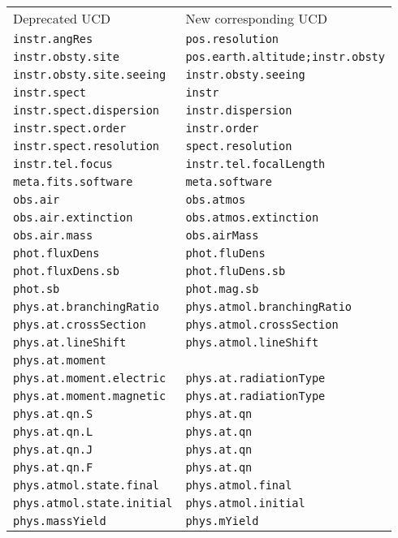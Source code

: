\documentclass[11pt,a4paper]{ivoa}
\begin{document}
\begin{enumerate}
\begin{tabular}{|l|l|}
\sptablerule
Deprecated UCD & New corresponding UCD\\
\sptablerule
{\tt instr.angRes} & {\tt pos.resolution}\\
{\tt instr.obsty.site} & {\tt pos.earth.altitude;instr.obsty}\\ 
{\tt instr.obsty.site.seeing} & {\tt instr.obsty.seeing}\\
{\tt instr.spect} & {\tt instr}\\
{\tt instr.spect.dispersion} & {\tt instr.dispersion}\\
{\tt instr.spect.order} & {\tt instr.order}\\
{\tt instr.spect.resolution} & {\tt spect.resolution}\\
{\tt instr.tel.focus} & {\tt instr.tel.focalLength}\\
{\tt meta.fits.software} & {\tt meta.software }\\
{\tt obs.air} & {\tt obs.atmos}\\
{\tt obs.air.extinction} & {\tt obs.atmos.extinction}\\
{\tt obs.air.mass} & {\tt obs.airMass}\\
{\tt phot.fluxDens} & {\tt phot.fluDens}\\
{\tt phot.fluxDens.sb} & {\tt phot.fluDens.sb}\\ 
{\tt phot.sb} & {\tt phot.mag.sb}\\
{\tt phys.at.branchingRatio} & {\tt phys.atmol.branchingRatio}\\
{\tt phys.at.crossSection} & {\tt phys.atmol.crossSection}\\
{\tt phys.at.lineShift} & {\tt phys.atmol.lineShift}\\
{\tt phys.at.moment} & \\
{\tt phys.at.moment.electric} & {\tt phys.at.radiationType}\\ 
{\tt phys.at.moment.magnetic} & {\tt phys.at.radiationType}\\
{\tt phys.at.qn.S} & {\tt phys.at.qn}\\
{\tt phys.at.qn.L} & {\tt phys.at.qn}\\
{\tt phys.at.qn.J} & {\tt phys.at.qn}\\
{\tt phys.at.qn.F} & {\tt phys.at.qn}\\
{\tt phys.atmol.state.final} & {\tt  phys.atmol.final}\\
{\tt phys.atmol.state.initial} & {\tt phys.atmol.initial}\\
{\tt phys.massYield} & {\tt phys.mYield}\\

\end{tabular}
\end{enumerate}
\end{document}
